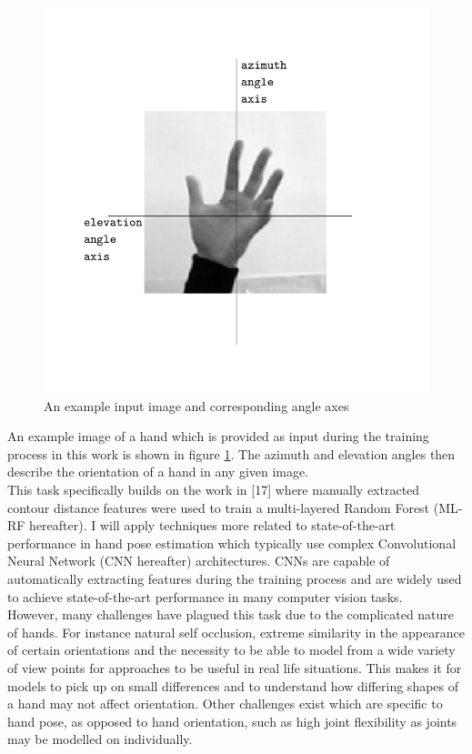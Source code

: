 \documentclass{article}
\begin{document}
\vspace*{-4mm}
\begin{figure}[h]
  \centering
  \includegraphics[scale=0.8]{example_hand2.pdf}
  \vspace*{-10mm}
  \caption{An example input image and corresponding angle axes}
  \label{fig:example_hand}
\end{figure}

An example image of a hand which is provided as input during the training process in this work is shown in figure \ref{fig:example_hand}. The azimuth and elevation angles then describe the orientation of a hand in any given image. \\

This task specifically builds on the work in [17] where manually extracted contour distance features were used to train a multi-layered Random Forest (ML-RF hereafter). I will apply techniques more related to state-of-the-art performance in hand pose estimation which typically use complex Convolutional Neural Network (CNN hereafter) architectures. CNNs are capable of automatically extracting features during the training process and are widely used to achieve state-of-the-art performance in many computer vision tasks. \\

However, many challenges have plagued this task due to the complicated nature of hands. For instance natural self occlusion, extreme similarity in the appearance of certain orientations and the necessity to be able to model from a wide variety of view points for approaches to be useful in real life situations. This makes it for models to pick up on small differences and to understand how differing shapes of a hand may not affect orientation. Other challenges exist which are specific to hand pose, as opposed to hand orientation, such as high joint flexibility as joints may be modelled on individually. \\
\end{document}
